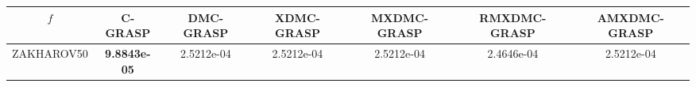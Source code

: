 \begin{table}[]
\begin{tabular}{|c|c|c|c|c|c|c|}
\hline
 $f$ & C-GRASP & DMC-GRASP & XDMC-GRASP & MXDMC-GRASP & RMXDMC-GRASP & AMXDMC-GRASP\\ \hline 
ZAKHAROV50 & \textbf{9.8843e-05} &  2.5212e-04 &  2.5212e-04 &  2.5212e-04 &  2.4646e-04 &  2.5212e-04\\  
\hline  
\end{tabular}
\end{table}

